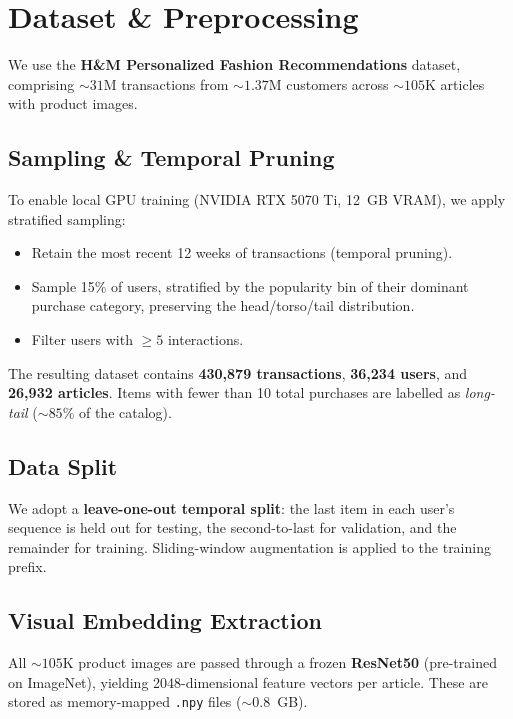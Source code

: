 \documentclass[11pt, a4paper]{article}
\let\oldsection\section
\renewcommand{\section}[1]{\FloatBarrier\oldsection{#1}}
\let\oldsubsection\subsection
\renewcommand{\subsection}[1]{\FloatBarrier\oldsubsection{#1}}
\begin{document}
\section{Dataset \& Preprocessing}
\label{sec:data}

We use the \textbf{H\&M Personalized Fashion Recommendations} dataset, comprising ${\sim}31$M transactions from ${\sim}1.37$M customers across ${\sim}105$K articles with product images.

\subsection{Sampling \& Temporal Pruning}

To enable local GPU training (NVIDIA RTX 5070 Ti, 12~GB VRAM), we apply stratified sampling:
\begin{itemize}[leftmargin=*,itemsep=2pt]
    \item Retain the most recent 12 weeks of transactions (temporal pruning).
    \item Sample 15\% of users, stratified by the popularity bin of their dominant purchase category, preserving the head/torso/tail distribution.
    \item Filter users with $\geq 5$ interactions.
\end{itemize}
The resulting dataset contains \textbf{430{,}879 transactions}, \textbf{36{,}234 users}, and \textbf{26{,}932 articles}.
Items with fewer than 10 total purchases are labelled as \emph{long-tail} (${\sim}85\%$ of the catalog).

\subsection{Data Split}

We adopt a \textbf{leave-one-out temporal split}: the last item in each user's sequence is held out for testing, the second-to-last for validation, and the remainder for training.
Sliding-window augmentation is applied to the training prefix.

\subsection{Visual Embedding Extraction}

All ${\sim}105$K product images are passed through a frozen \textbf{ResNet50} (pre-trained on ImageNet), yielding 2048-dimensional feature vectors per article.
These are stored as memory-mapped \texttt{.npy} files (${\sim}0.8$~GB).
\end{document}
